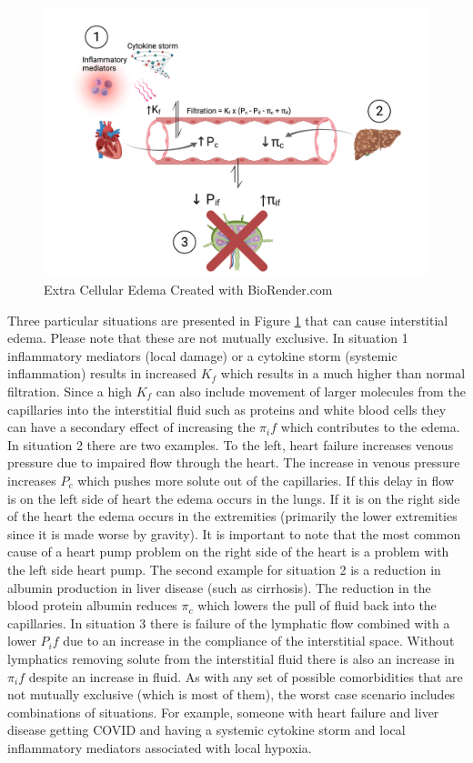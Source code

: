 \begin{figure}[!h]
    \centering
    \includegraphics[width=1\linewidth]{./figure/Extracellular_Edema.png}
    \caption{Extra Cellular Edema \footnotesize{Created with BioRender.com}}
    \label{fig:Extracellular_Edema}
\end{figure}

Three particular situations are presented in Figure \ref{fig:Extracellular_Edema} that can cause interstitial edema. Please note that these are not mutually exclusive. 
In situation 1 inflammatory mediators (local damage) or a cytokine storm (systemic inflammation) results in increased $K_f$ which results in a much higher than normal filtration. Since a high $K_f$ can also include movement of larger molecules from the capillaries into the interstitial fluid such as proteins and white blood cells they can have a secondary effect of increasing the $\pi_if$ which contributes to the edema. 
In situation 2 there are two examples. To the left, heart failure increases venous pressure due to impaired flow through the heart. The increase in venous pressure increases $P_c$ which pushes more solute out of the capillaries. If this delay in flow is on the left side of heart the edema occurs in the lungs. If it is on the right side of the heart the edema occurs in the extremities (primarily the lower extremities since it is made worse by gravity). It is important to note that the most common cause of a heart pump problem on the right side of the heart is a problem with the left side heart pump. The second example for situation 2 is a reduction in albumin production in liver disease (such as cirrhosis). The reduction in the blood protein albumin reduces $\pi_c$ which lowers the pull of fluid back into the capillaries.
In situation 3 there is failure of the lymphatic flow combined with a lower $P_if$ due to an increase in the compliance of the interstitial space. Without lymphatics removing solute from the interstitial fluid there is also an increase in $\pi_if$ despite an increase in fluid.
As with any set of possible comorbidities that are not mutually exclusive (which is most of them), the worst case scenario includes combinations of situations. For example, someone with heart failure and liver disease getting COVID and having a systemic cytokine storm and local inflammatory mediators associated with local hypoxia. 

